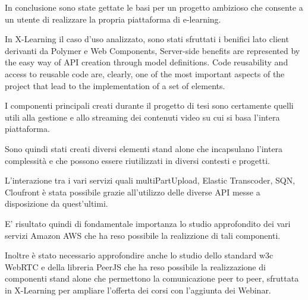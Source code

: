 
In conclusione sono state gettate le basi per un progetto ambizioso che consente a un utente di realizzare la propria piattaforma di e-learning.

In X-Learning il caso d'uso analizzato, sono stati sfruttati i benifici lato client derivanti da Polymer e Web Components, Server-side benefits are represented by the easy way of API creation through model definitions.
Code reusability and access to reusable code are, clearly, one of the most important aspects of the project that lead to the implementation of a set of elements.

I componenti principali creati durante il progetto di tesi sono certamente quelli utili alla gestione e allo streaming dei contenuti video su cui si basa l'intera piattaforma.

Sono quindi stati creati diversi elementi stand alone che incapsulano l'intera complessità e che possono essere riutilizzati in diversi contesti e progetti.

L'interazione tra i vari servizi quali multiPartUpload, Elastic Transcoder, SQN, Cloufront è stata possibile grazie all'utilizzo delle diverse API messe a disposizione da quest'ultimi.

E' risultato quindi di fondamentale importanza lo studio approfondito dei vari servizi Amazon AWS che ha reso possibile la realizzione di tali componenti.

Inoltre è stato necessario approfondire anche lo studio dello standard w3c WebRTC e della libreria PeerJS che ha reso possibile la realizzazione di componenti stand alone che permettono la comunicazione peer to peer, sfruttata in X-Learning per ampliare l'offerta dei corsi con l'aggiunta dei Webinar.